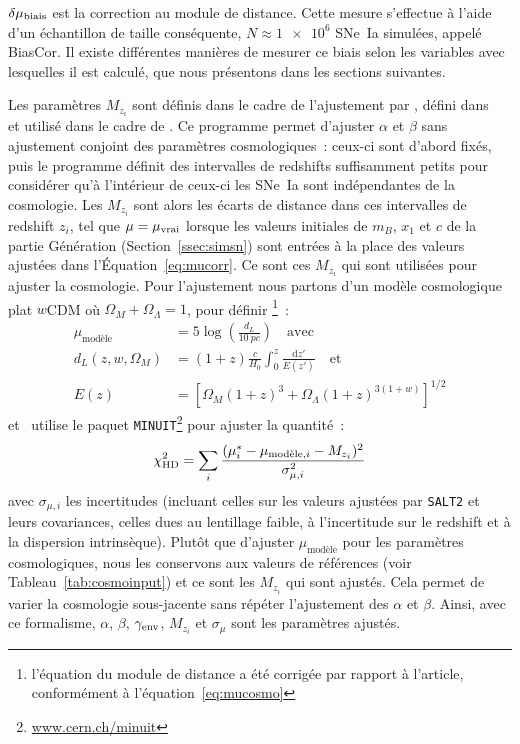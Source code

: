 \documentclass[../main/main.tex]{subfiles}
\begin{document}
$\delta\mu_{\rm biais}$ est la correction au module de distance. Cette mesure
s'effectue à l'aide d'un échantillon de taille conséquente, $N \approx
\num{1e6}$ SNe~Ia simulées, appelé BiasCor. Il existe différentes manières de
mesurer ce biais selon les variables avec lesquelles il est calculé, que nous
présentons dans les sections suivantes.

Les paramètres $M_{z_i}$ sont définis dans le cadre de l'ajustement par \saltmu,
défini dans~\cite{marriner2011} et utilisé dans le cadre de \bbc. Ce programme
permet d'ajuster $\alpha$ et $\beta$ sans ajustement conjoint des paramètres
cosmologiques~: ceux-ci sont d'abord fixés, puis le programme définit des
intervalles de redshifts suffisamment petits pour considérer qu'à l'intérieur de
ceux-ci les SNe~Ia sont indépendantes de la cosmologie. Les $M_{z_i}$ sont alors
les écarts de distance dans ces intervalles de redshift $z_i$, tel que $\mu =
\mu_{\rm vrai}$ lorsque les valeurs initiales de $m_B$, $x_1$ et $c$ de la
partie Génération (Section~\ref{ssec:simsn}) sont entrées à la place des valeurs
ajustées dans l'Équation~\ref{eq:mucorr}. Ce sont ces $M_{z_i}$ qui sont
utilisées pour ajuster la cosmologie. Pour l'ajustement nous partons d'un modèle
cosmologique plat $w$CDM où $\Omega_M + \Omega_{\Lambda} = 1$, pour définir
\citep{kessler2017}\footnote{l'équation du module de distance a été corrigée par
rapport à l'article, conformément à l'équation~\ref{eq:mucosmo}}~:
\begin{align}\label{eq:mumodel}
    \mu_{\text{modèle}} & = 5\log\left(\frac{d_L}{\SI{10}{pc}}\right)
                             \quad\text{avec}\\
    d_L(z,w,\Omega_M)   & = (1+z)
                            \frac{c}{H_0}
                            \int_{0}^{z} \frac{\mathrm{d} z'}{E(z')}
                            \quad\text{et}\\
    E(z)                & = \left[ \Omega_M(1+z)^3
                                 + \Omega_{\Lambda}(1+z)^{3(1+w)}
                             \right]^{1/2}
\end{align}
et \saltmu\ utilise le paquet
\texttt{MINUIT}\footnote{\href{www.cern.ch/minuit}{www.cern.ch/minuit}}
\citep{james1975} pour ajuster la quantité~:
\begin{equation}
    \chi^2_{\rm HD} = \sum_i \frac{
                          (\mu_i^* - \mu_{\text{modèle},i} - M_{z_i})^2}{
                      \sigma_{\mu,i}^2}
\end{equation}
avec $\sigma_{\mu,i}$ les incertitudes (incluant celles sur les valeurs ajustées
par \texttt{SALT2} et leurs covariances, celles dues au lentillage faible, à
l'incertitude sur le redshift et à la dispersion intrinsèque). Plutôt que
d'ajuster $\mu_{\text{modèle}}$ pour les paramètres cosmologiques, nous les
conservons aux valeurs de références (voir Tableau~\ref{tab:cosmoinput}) et ce
sont les $M_{z_i}$ qui sont ajustés. Cela permet de varier la cosmologie
sous-jacente sans répéter l'ajustement des $\alpha$ et $\beta$. Ainsi, avec ce
formalisme, $\alpha$, $\beta$, $\gamma_{\rm env}$, $M_{z_i}$ et $\sigma_{\mu}$
sont les paramètres ajustés.
\end{document}
